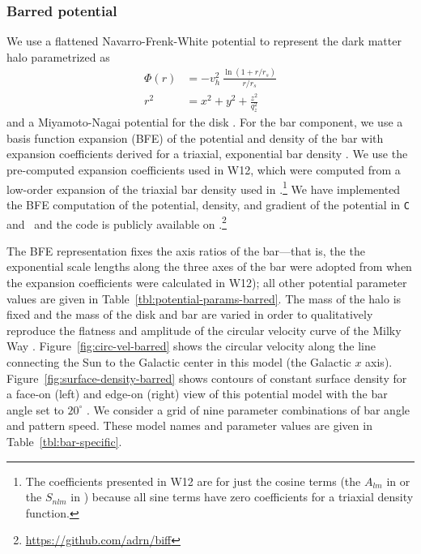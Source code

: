 \documentclass[letterpaper,12pt,preprint]{aastex}
\begin{document}
\subsubsection{Barred potential}
We use a flattened Navarro-Frenk-White potential to represent the dark matter halo \citep[e.g.,][]{kuepper15} parametrized as
\begin{align}
	\Phi(r) &= -v_h^2\,\frac{\ln{(1 + r/r_s)}}{r/r_s}\label{eq:flatnfw}\\
	r^2 &= x^2 + y^2 + \frac{z^2}{q_z^2}
\end{align}
and a Miyamoto-Nagai potential for the disk \citep{miyamoto75}. For the bar component, we use a basis function expansion (BFE) of the potential and density of the bar with expansion coefficients derived for a triaxial, exponential bar density \citep[][hereafter W12]{wang12}. We use the pre-computed expansion coefficients used in W12, which were computed from a low-order expansion of the triaxial bar density used in \citet{dwek95}.\footnote{The coefficients presented in W12 are for just the cosine terms (the $A_{lm}$ in \citet{hernquist92} or the $S_{nlm}$ in \citet{lowing11}) because all sine terms have zero coefficients for a triaxial density function.} We have implemented the BFE computation of the potential, density, and gradient of the potential in \texttt{C} and \python\ and the code is publicly available on \github.\footnote{\url{https://github.com/adrn/biff}} 

The BFE representation fixes the axis ratios of the bar---that is, the the exponential scale lengths along the three axes of the bar were adopted from \cite{dwek95} when the expansion coefficients were calculated in W12); all other potential parameter values are given in Table~\ref{tbl:potential-params-barred}. The mass of the halo is fixed and the mass of the disk and bar are varied in order to qualitatively reproduce the flatness and amplitude of the circular velocity curve of the Milky Way \citep{bovy12}. Figure~\ref{fig:circ-vel-barred} shows the circular velocity along the line connecting the Sun to the Galactic center in this model (the Galactic $x$ axis). Figure~\ref{fig:surface-density-barred} shows contours of constant surface density for a face-on (left) and edge-on (right) view of this potential model with the bar angle set to $20^\circ$ \citep[compare to, e.g., Figure 3 in][]{portail15}. We consider a grid of nine parameter combinations of bar angle and pattern speed. These model names and parameter values are given in Table~\ref{tbl:bar-specific}.
\end{document}
